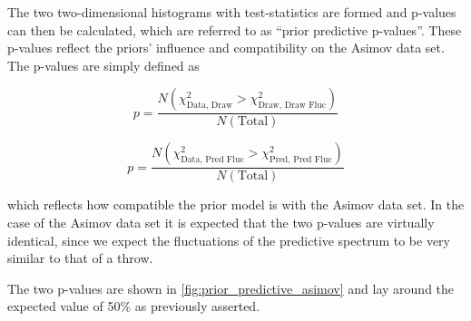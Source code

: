 The two two-dimensional histograms with test-statistics are formed and p-values can then be calculated, which are referred to as ``prior predictive p-values''.  These p-values reflect the priors' influence and compatibility on the Asimov data set. The p-values are simply defined as

\begin{equation}
p = \frac{N\left(\chi^2_{\text{Data, Draw}} > \chi^2_{\text{Draw, Draw Fluc}}\right)}{N\left(\text{Total}\right)}
\end{equation}

\begin{equation}
p = \frac{N\left(\chi^2_{\text{Data, Pred Fluc}} > \chi^2_{\text{Pred, Pred Fluc}}\right)}{N\left(\text{Total}\right)}
\end{equation}

which reflects how compatible the prior model is with the Asimov data set. In the case of the Asimov data set it is expected that the two p-values are virtually identical, since we expect the fluctuations of the predictive spectrum to be very similar to that of a throw.  

The two p-values are shown in \autoref{fig:prior_predictive_asimov} and lay around the expected value of 50\% as previously asserted.

